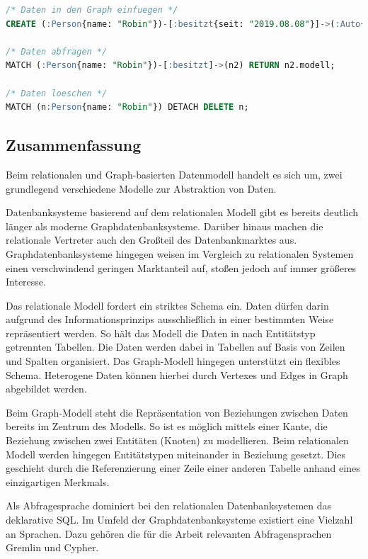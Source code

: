\begin{lstlisting}[caption={Beispiel Cypher-Queries},language=SQL,label=src:cypher_example]
/* Daten in den Graph einfuegen */
CREATE (:Person{name: "Robin"})-[:besitzt{seit: "2019.08.08"}]->(:Auto{modell: "Leaf"});

/* Daten abfragen */
MATCH (:Person{name: "Robin"})-[:besitzt]->(n2) RETURN n2.modell;

/* Daten loeschen */
MATCH (n:Person{name: "Robin"}) DETACH DELETE n;
\end{lstlisting}

\subsection{Zusammenfassung}

Beim relationalen und Graph-basierten Datenmodell handelt es sich um, zwei grundlegend verschiedene Modelle zur Abstraktion von Daten.

Datenbanksysteme basierend auf dem relationalen Modell gibt es bereits deutlich länger als moderne Graphdatenbanksysteme. Darüber hinaus machen die relationale Vertreter auch den Großteil des Datenbankmarktes aus. Graphdatenbanksysteme hingegen weisen im Vergleich zu relationalen Systemen einen verschwindend geringen Marktanteil auf, stoßen jedoch auf immer größeres Interesse. 

Das relationale Modell fordert ein striktes Schema ein. Daten dürfen darin aufgrund des Informationsprinzips ausschließlich in einer bestimmten Weise repräsentiert werden. So hält das Modell die Daten in nach Entitätstyp getrennten Tabellen. Die Daten werden dabei in Tabellen auf Basis von Zeilen und Spalten organisiert. Das Graph-Modell hingegen unterstützt ein flexibles Schema. Heterogene Daten können hierbei durch Vertexes und Edges in Graph abgebildet werden. 

Beim Graph-Modell steht die Repräsentation von Beziehungen zwischen Daten bereits im Zentrum des Modells. So ist es möglich mittels einer Kante, die Beziehung zwischen zwei Entitäten (Knoten) zu modellieren. Beim relationalen Modell werden hingegen Entitätstypen miteinander in Beziehung gesetzt. Dies geschieht durch die Referenzierung einer Zeile einer anderen Tabelle anhand eines einzigartigen Merkmals.

Als Abfragesprache dominiert bei den relationalen Datenbanksystemen das deklarative SQL. Im Umfeld der Graphdatenbanksysteme existiert eine Vielzahl an Sprachen. Dazu gehören die für die Arbeit relevanten Abfragensprachen Gremlin und Cypher. 